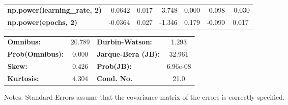 \begin{center}
\begin{tabular}{lcccccc}
\textbf{np.power(learning\_rate, 2)} &      -0.0642  &        0.017     &    -3.748  &         0.000        &       -0.098    &       -0.030     \\
\textbf{np.power(epochs, 2)}         &      -0.0364  &        0.027     &    -1.346  &         0.179        &       -0.090    &        0.017     \\
\bottomrule
\end{tabular}
\begin{tabular}{lclc}
\textbf{Omnibus:}       & 20.789 & \textbf{  Durbin-Watson:     } &    1.293  \\
\textbf{Prob(Omnibus):} &  0.000 & \textbf{  Jarque-Bera (JB):  } &   32.961  \\
\textbf{Skew:}          &  0.426 & \textbf{  Prob(JB):          } & 6.96e-08  \\
\textbf{Kurtosis:}      &  4.304 & \textbf{  Cond. No.          } &     21.0  \\
\bottomrule
\end{tabular}
\end{center}

Notes: \newline
 [1] Standard Errors assume that the covariance matrix of the errors is correctly specified.